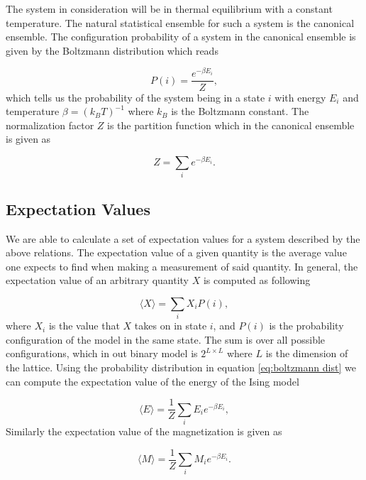 \documentclass[a4paper, 10pt, reqno]{amsart}
\begin{document}
The system in consideration will be in thermal equilibrium with a constant
temperature. The natural statistical ensemble for such a system is
the canonical ensemble. The configuration probability of a system in the
canonical ensemble is given by the Boltzmann distribution which reads

\begin{equation}\label{eq:boltzmann dist}
    P(i) = \frac{e^{-\beta E_i}}{Z},
\end{equation}
which tells us the probability of the system being in a state $i$ with
energy $E_i$ and temperature $\beta = (k_B T)^{-1}$ where $k_B$ is the
Boltzmann constant. The normalization factor $Z$ is the partition function
which in
the canonical ensemble is given as

\begin{equation}\label{eq:partition func}
    Z = \sum_i e^{-\beta E_i}.
\end{equation}

\subsection{Expectation Values}
We are able to calculate a set of expectation values for a system
described by the above relations. The expectation value of a given
quantity is the average value one expects to find when making a
measurement of said quantity. In general, the expectation value of an
arbitrary quantity $X$ is computed as following

\begin{equation}\label{eq: <X>}
    \langle X \rangle = \sum_i X_i P(i),
\end{equation}
where $X_i$ is the value that $X$ takes on in state $i$, and $P(i)$
is the probability configuration of the model in the same state. The sum is
over all possible configurations, which in out binary model is $2^{L\times L}$
where $L$ is the dimension of the lattice. Using the probability distribution
in equation \eqref{eq:boltzmann dist} we can compute the expectation value of
the energy of the Ising model

\begin{equation}\label{eq: <E>}
    \langle E \rangle = \frac{1}{Z} \sum_i E_i e^{- \beta E_i},
\end{equation}
Similarly the expectation value of the magnetization is given as

\begin{equation}\label{eq: <M>}
    \langle M \rangle = \frac{1}{Z} \sum_i M_i e^{- \beta E_i}.
\end{equation}
\end{document}
